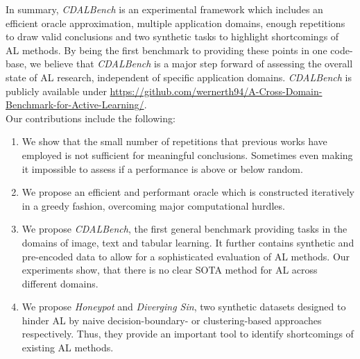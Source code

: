 \documentclass[]{article}
\begin{document}
In summary, \emph{CDALBench} is an experimental framework which includes an
efficient oracle approximation, multiple application domains, enough repetitions to
draw valid conclusions and two synthetic tasks to highlight shortcomings of AL methods. 
By being the first benchmark to providing these points in one code-base, 
we believe that \emph{CDALBench} is a major step forward of assessing the overall state of AL research, independent of
specific application domains. \emph{CDALBench} is publicly available under \url{https://github.com/wernerth94/A-Cross-Domain-Benchmark-for-Active-Learning/}. \\ [1mm]
Our contributions include the following:
%
\begin{enumerate}
\item\label{cont:repetitions} We show that the small number of repetitions that previous works have employed is not
sufficient for meaningful conclusions. Sometimes even making it impossible to assess if a performance is above or below random.
\item\label{cont:oracle} We propose an efficient and performant oracle which is constructed iteratively in a greedy fashion,
overcoming major computational hurdles.
\item\label{cont:domains} We propose \emph{CDALBench}, the first general benchmark providing tasks
in the domains of image, text and tabular learning. It further contains
synthetic and pre-encoded data to allow for a sophisticated evaluation of AL
methods. Our experiments show, that there is no clear SOTA method
for AL across different domains.
\item\label{cont:synthdata} We propose \emph{Honeypot} and \emph{Diverging Sin}, two synthetic datasets
designed to hinder AL by naive decision-boundary- or
clustering-based approaches respectively. Thus, they provide an important tool to identify 
shortcomings of existing AL methods.
\end{enumerate}


\end{document}
